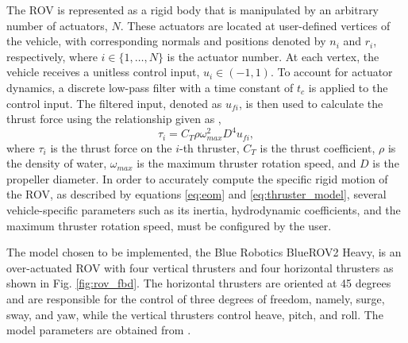 The \ac{ROV} is represented as a rigid body that is manipulated by an arbitrary number of actuators, $N$. These actuators are located at user-defined vertices of the vehicle, with corresponding normals and positions denoted by $n_i$ and $r_i$, respectively, where $i \in \{1,\dots, N\}$ is the actuator number. %
At each vertex, the vehicle receives a unitless control input, $u_i\in (-1,1)$. To account for actuator dynamics, a discrete low-pass filter with a time constant of $t_c$ is applied to the control input. The filtered input, denoted as $u_{fi}$, is then used to calculate the thrust force using the relationship given as \cite{airsim},
%
\begin{equation}\label{eq:thruster_model}
  \tau_i = C_T \rho \omega^2_{max} D^4 u_{fi}, 
\end{equation}
%
where $\tau_i$ is the thrust force on the $i$-th thruster, $C_T$ is the thrust coefficient, $\rho$ is the density of water, $\omega_{max}$ is the maximum thruster rotation speed, and $D$ is the propeller diameter. 
In order to accurately compute the specific rigid motion of the \ac{ROV}, as described by equations \eqref{eq:eom} and \eqref{eq:thruster_model}, several vehicle-specific parameters such as its inertia, hydrodynamic coefficients, and the maximum thruster rotation speed, must be configured by the user. %

The model chosen to be implemented, the Blue Robotics BlueROV2 Heavy, is an over-actuated \ac{ROV} with four vertical thrusters and four horizontal thrusters as shown in Fig. \ref{fig:rov_fbd}. The horizontal thrusters are oriented at 45 degrees and are responsible for the control of three degrees of freedom, namely, surge, sway, and yaw, while the vertical thrusters control heave, pitch, and roll. The model parameters are obtained from \cite{bluerov2_h}. 






